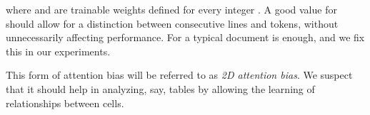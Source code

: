 where  and  are trainable weights defined for every
integer . A good value for  should allow for a distinction
between consecutive lines and tokens, without unnecessarily affecting
performance. For a typical document  is enough, and we fix this in our
experiments.

This form of attention bias will be referred to as \emph{2D attention bias}. We
suspect that it should help in analyzing, say, tables by allowing the learning
of relationships between cells.




